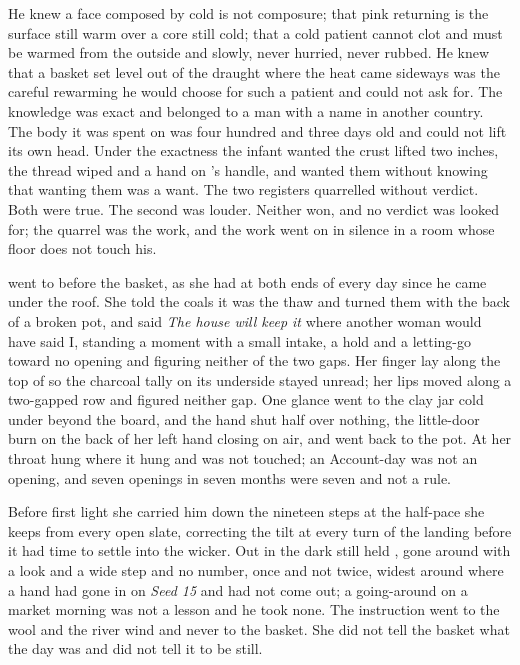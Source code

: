 He knew a face composed by cold is not composure; that pink returning is the surface still warm over a core still cold; that a cold patient cannot clot and must be warmed from the outside and slowly, never hurried, never rubbed. He knew that a basket set level out of the draught where the heat came sideways was the careful rewarming he would choose for such a patient and could not ask for. The knowledge was exact and belonged to a man with a name in another country. The body it was spent on was four hundred and three days old and could not lift its own head. Under the exactness the infant wanted the crust lifted two inches, the thread wiped and a hand on 's handle, and wanted them without knowing that wanting them was a want. The two registers quarrelled without verdict. Both were true. The second was louder. Neither won, and no verdict was looked for; the quarrel was the work, and the work went on in silence in a room whose floor does not touch his.

 went to  before the basket, as she had at both ends of every day since he came under the roof. She told the coals it was the thaw and turned them with the back of a broken pot, and said \emph{The house will keep it} where another woman would have said I, standing a moment with a small intake, a hold and a letting-go toward no opening and figuring neither of the two gaps. Her finger lay along the top of  so the charcoal tally on its underside stayed unread; her lips moved along a two-gapped row and figured neither gap. One glance went to the clay jar cold under  beyond the board, and the hand shut half over nothing, the little-door burn on the back of her left hand closing on air, and went back to the pot. At her throat  hung where it hung and was not touched; an Account-day was not an opening, and seven openings in seven months were seven and not a rule.

Before first light she carried him down the nineteen steps at the half-pace she keeps from every open slate, correcting the tilt at every turn of the landing before it had time to settle into the wicker. Out in  the dark still held , gone around with a look and a wide step and no number, once and not twice, widest around  where a hand had gone in on \emph{Seed 15} and had not come out; a going-around on a market morning was not a lesson and he took none. The instruction went to the wool and the river wind and never to the basket. She did not tell the basket what the day was and did not tell it to be still.

